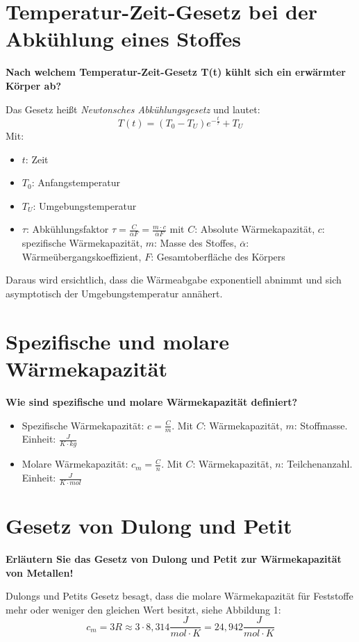 \documentclass[a4paper, 12pt]{article}
\begin{document}
\section{Temperatur-Zeit-Gesetz bei der Abkühlung eines Stoffes}
\textbf{Nach welchem Temperatur-Zeit-Gesetz T(t) kühlt sich ein erwärmter Körper ab?}

\noindent Das Gesetz heißt \textit{Newtonsches Abkühlungsgesetz} und lautet:
$$T(t)=(T_0-T_U)e^{-\frac{t}{\tau}} + T_U$$
Mit:
\begin{itemize}
\item $t$: Zeit
\item $T_0$: Anfangstemperatur
\item $T_U$: Umgebungstemperatur
\item $\tau$: Abkühlungsfaktor $\tau=\frac{C}{\overline{\alpha}F}=\frac{m \cdot c}{\overline{\alpha}F}$ mit $C$: Absolute Wärmekapazität, $c$: spezifische Wärmekapazität, $m$: Masse des Stoffes, $\overline{\alpha}$: Wärmeübergangskoeffizient, $F$: Gesamtoberfläche des Körpers
\end{itemize}

\noindent Daraus wird ersichtlich, dass die Wärmeabgabe exponentiell abnimmt und sich asymptotisch der Umgebungstemperatur annähert.

\section{Spezifische und molare Wärmekapazität}
\textbf{Wie sind spezifische und molare Wärmekapazität definiert?}
\begin{itemize}
\item Spezifische Wärmekapazität: $c = \frac{C}{m}$. Mit $C$: Wärmekapazität, $m$: Stoffmasse. Einheit: $\frac{J}{K \cdot kg}$
\item Molare Wärmekapazität: $c_m = \frac{C}{n}$. Mit $C$: Wärmekapazität, $n$: Teilchenanzahl. Einheit: $\frac{J}{K \cdot mol}$

\end{itemize}

\section{Gesetz von Dulong und Petit}
\textbf{Erläutern Sie das Gesetz von Dulong und Petit zur Wärmekapazität von Metallen!}

\noindent Dulongs und Petits Gesetz besagt, dass die molare Wärmekapazität für Feststoffe mehr oder weniger den gleichen Wert besitzt, siehe Abbildung 1: 
$$c_m = 3R \approx 3 \cdot 8,314 \frac{J}{mol \cdot K} = 24,942 \frac{J}{mol \cdot K} $$
\end{document}

